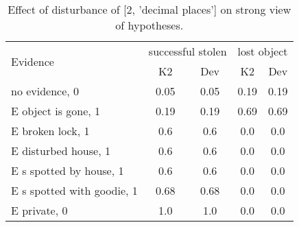 \begin{table}\begin{tabular}{l|cc|cc}\toprule\multirow{2}{*}{Evidence} & \multicolumn{2}{c}{successful stolen}& \multicolumn{2}{c}{lost object}\\& {K2} & {Dev}& {K2} & {Dev}\\\midrule
no evidence, 0 & 0.05&0.05&0.19&0.19\\E object is gone, 1 & 0.19&0.19&0.69&0.69\\E broken lock, 1 & 0.6&0.6&0.0&0.0\\E disturbed house, 1 & 0.6&0.6&0.0&0.0\\E s spotted by house, 1 & 0.6&0.6&0.0&0.0\\E s spotted with goodie, 1 & 0.68&0.68&0.0&0.0\\E private, 0 & 1.0&1.0&0.0&0.0\\\bottomrule\end{tabular}\caption{Effect of disturbance of [2, 'decimal places'] on strong view of hypotheses.}\end{table}